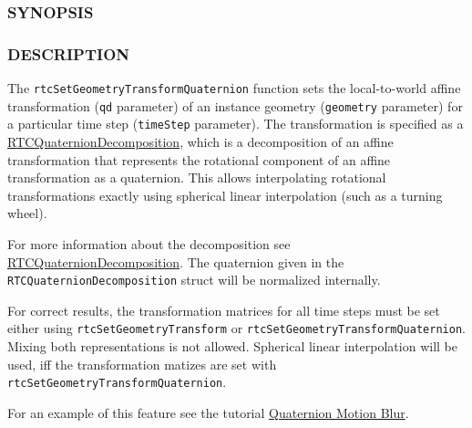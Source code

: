 \subsubsection{SYNOPSIS}\label{synopsis}

\begin{Shaded}
\begin{Highlighting}[]

\OperatorTok{(}
\OperatorTok{,}
   \OperatorTok{,}
   \OperatorTok{*}
\OperatorTok{);}
\end{Highlighting}
\end{Shaded}

\subsubsection{DESCRIPTION}\label{description}

The \texttt{rtcSetGeometryTransformQuaternion} function sets the
local-to-world affine transformation (\texttt{qd} parameter) of an
instance geometry (\texttt{geometry} parameter) for a particular time
step (\texttt{timeStep} parameter). The transformation is specified as a
\hyperref[rtcquaterniondecomposition]{RTCQuaternionDecomposition}, which
is a decomposition of an affine transformation that represents the
rotational component of an affine transformation as a quaternion. This
allows interpolating rotational transformations exactly using spherical
linear interpolation (such as a turning wheel).

For more information about the decomposition see
\hyperref[rtcquaterniondecomposition]{RTCQuaternionDecomposition}. The
quaternion given in the \texttt{RTCQuaternionDecomposition} struct will
be normalized internally.

For correct results, the transformation matrices for all time steps must
be set either using \texttt{rtcSetGeometryTransform} or
\texttt{rtcSetGeometryTransformQuaternion}. Mixing both representations
is not allowed. Spherical linear interpolation will be used, iff the
transformation matizes are set with
\texttt{rtcSetGeometryTransformQuaternion}.

For an example of this feature see the tutorial
\hyperref[quaternion-motion-blur]{Quaternion Motion Blur}.

